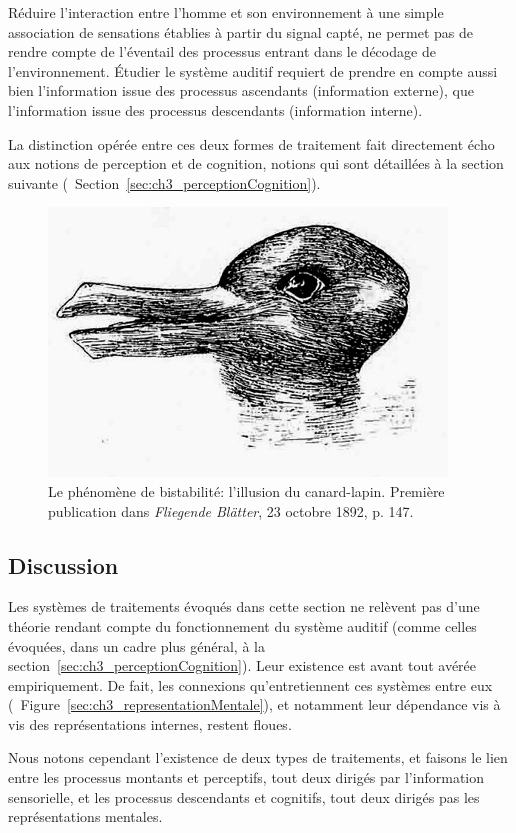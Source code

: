 Réduire l'interaction entre l'homme et son environnement à une simple association de sensations établies à partir du signal capté, ne permet pas de rendre compte de l'éventail des processus entrant dans le décodage de l'environnement. Étudier le système auditif requiert de prendre en compte aussi bien l'information issue des processus ascendants (information externe), que l'information issue des processus descendants (information interne).

La distinction opérée entre ces deux formes de traitement fait directement écho aux notions de perception et de cognition, notions qui sont détaillées à la section suivante (\cf~Section~\ref{sec:ch3_perceptionCognition}).

\begin{figure}[t]
        \myfloatalign
        \includegraphics[width=.6\linewidth]{gfx/ch_3/canard_lapin}
        \caption[Le phénomène de bistabilité: l'illusion du canard-lapin.]{Le phénomène de bistabilité: l'illusion du canard-lapin. Première publication dans \emph{Fliegende Blätter}, 23 octobre 1892, p. 147.}\label{fig:bistabilite}
\end{figure}

\subsection{Discussion}

Les systèmes de traitements évoqués dans cette section ne relèvent pas d'une théorie rendant compte du fonctionnement du système auditif (comme celles évoquées, dans un cadre plus général, à la section~\ref{sec:ch3_perceptionCognition}). Leur existence est avant tout avérée empiriquement. De fait, les connexions qu'entretiennent ces systèmes entre eux (\cf~Figure~\ref{sec:ch3_representationMentale}), et notamment leur dépendance vis à vis des représentations internes, restent floues.

Nous notons cependant l'existence de deux types de traitements, et faisons le lien entre les processus montants et perceptifs, tout deux dirigés par l'information sensorielle, et les processus descendants et cognitifs, tout deux dirigés pas les représentations mentales.

